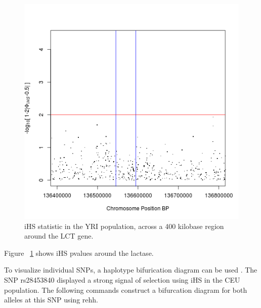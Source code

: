 \documentclass[a4paper,10pt]{article}
\begin{document}
\begin{figure}
\centering
\includegraphics{pictures/YRIihs.png}
\caption{iHS statistic in the YRI population, across a 400 kilobase region around the LCT gene. }
\label{fig:yriihs}
\end{figure}

\noindent
Figure ~\ref{fig:yriihs} shows iHS pvalues around the lactase.

To visualize individual SNPs, a haplotype bifurication diagram can be
used \citep{Gautier:2012et}. The SNP rs28453840 displayed a strong signal of
selection using iHS in the CEU population. The following commands construct a bifurcation diagram for both
alleles at this SNP using rehh. \\

\noindent
\end{document}
